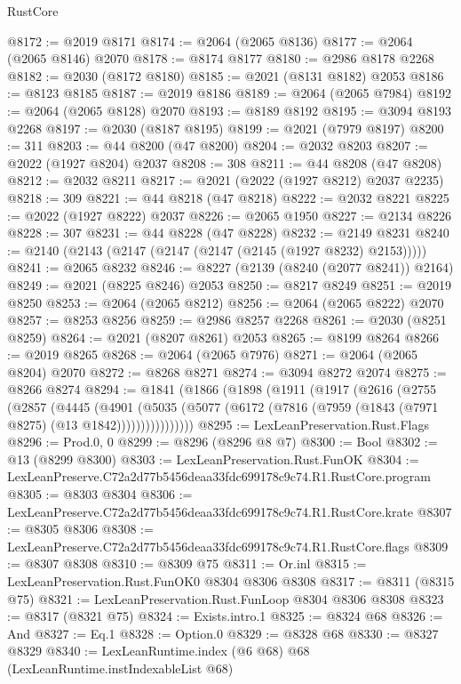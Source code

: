 \begin{lexlean}{RustCore}
\begin{coremodule}
@8172 := @2019 @8171
@8174 := @2064 (@2065 @8136)
@8177 := @2064 (@2065 @8146) @2070
@8178 := @8174 @8177
@8180 := @2986 @8178 @2268
@8182 := @2030 (@8172 @8180)
@8185 := @2021 (@8131 @8182) @2053
@8186 := @8123 @8185
@8187 := @2019 @8186
@8189 := @2064 (@2065 @7984)
@8192 := @2064 (@2065 @8128) @2070
@8193 := @8189 @8192
@8195 := @3094 @8193 @2268
@8197 := @2030 (@8187 @8195)
@8199 := @2021 (@7979 @8197)
@8200 := 311
@8203 := @44 @8200 (@47 @8200)
@8204 := @2032 @8203
@8207 := @2022 (@1927 @8204) @2037
@8208 := 308
@8211 := @44 @8208 (@47 @8208)
@8212 := @2032 @8211
@8217 := @2021 (@2022 (@1927 @8212) @2037 @2235)
@8218 := 309
@8221 := @44 @8218 (@47 @8218)
@8222 := @2032 @8221
@8225 := @2022 (@1927 @8222) @2037
@8226 := @2065 @1950
@8227 := @2134 @8226
@8228 := 307
@8231 := @44 @8228 (@47 @8228)
@8232 := @2149 @8231
@8240 := @2140 (@2143 (@2147 (@2147 (@2147 (@2145 (@1927 @8232) @2153)))))
@8241 := @2065 @8232
@8246 := @8227 (@2139 (@8240 (@2077 @8241)) @2164)
@8249 := @2021 (@8225 @8246) @2053
@8250 := @8217 @8249
@8251 := @2019 @8250
@8253 := @2064 (@2065 @8212)
@8256 := @2064 (@2065 @8222) @2070
@8257 := @8253 @8256
@8259 := @2986 @8257 @2268
@8261 := @2030 (@8251 @8259)
@8264 := @2021 (@8207 @8261) @2053
@8265 := @8199 @8264
@8266 := @2019 @8265
@8268 := @2064 (@2065 @7976)
@8271 := @2064 (@2065 @8204) @2070
@8272 := @8268 @8271
@8274 := @3094 @8272 @2074
@8275 := @8266 @8274
@8294 := @1841
    (@1866
      (@1898
        (@1911
          (@1917
            (@2616
              (@2755
                (@2857
                  (@4445
                    (@4901
                      (@5035
                        (@5077 (@6172 (@7816 (@7959 (@1843 (@7971 @8275) (@13 @1842))))))))))))))))
@8295 := LexLeanPreservation.Rust.Flags
@8296 := Prod.{0, 0}
@8299 := @8296 (@8296 @8 @7)
@8300 := Bool
@8302 := @13 (@8299 @8300)
@8303 := LexLeanPreservation.Rust.FunOK
@8304 := LexLeanPreserve.C72a2d77b5456deaa33fdc699178c9c74.R1.RustCore.program
@8305 := @8303 @8304
@8306 := LexLeanPreserve.C72a2d77b5456deaa33fdc699178c9c74.R1.RustCore.krate
@8307 := @8305 @8306
@8308 := LexLeanPreserve.C72a2d77b5456deaa33fdc699178c9c74.R1.RustCore.flags
@8309 := @8307 @8308
@8310 := @8309 @75
@8311 := Or.inl
@8315 := LexLeanPreservation.Rust.FunOK0 @8304 @8306 @8308
@8317 := @8311 (@8315 @75)
@8321 := LexLeanPreservation.Rust.FunLoop @8304 @8306 @8308
@8323 := @8317 (@8321 @75)
@8324 := Exists.intro.{1}
@8325 := @8324 @68
@8326 := And
@8327 := Eq.{1}
@8328 := Option.{0}
@8329 := @8328 @68
@8330 := @8327 @8329
@8340 := LexLeanRuntime.index
    (@6 @68)
    @68
    (LexLeanRuntime.instIndexableList @68)

\end{coremodule}
\end{lexlean}
